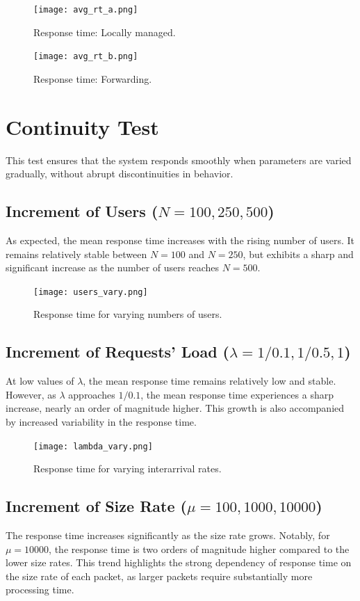 \documentclass{report}
\begin{document}
\begin{figure}[H]
    \centering
    \texttt{[image: avg\_rt\_a.png]}
    \caption{Response time: Locally managed.}
    \label{avg_rt_a}
\end{figure}

\begin{figure}[H]
    \centering
    \texttt{[image: avg\_rt\_b.png]}
    \caption{Response time: Forwarding.}
    \label{avg_rt_b}
\end{figure}

\section{Continuity Test}
This test ensures that the system responds smoothly when parameters are varied gradually, without abrupt discontinuities in behavior.

\subsection{Increment of Users ($N = 100, 250, 500$)}\label{nusers}
As expected, the mean response time increases with the rising number of users. It remains relatively stable between $N = 100$ and $N = 250$, but exhibits a sharp and significant increase as the number of users reaches $N = 500$.

\begin{figure}[H]
    \centering
    \texttt{[image: users\_vary.png]}
    \caption{Response time for varying numbers of users.}
\end{figure}

\subsection{Increment of Requests' Load ($\lambda = 1/0.1, 1/0.5, 1$)}
At low values of $\lambda$, the mean response time remains relatively low and stable. However, as $\lambda$ approaches $1/0.1$, the mean response time experiences a sharp increase, nearly an order of magnitude higher. This growth is also accompanied by increased variability in the response time.

\begin{figure}[H]
    \centering
    \texttt{[image: lambda\_vary.png]}
    \caption{Response time for varying interarrival rates.}
\end{figure}

\subsection{Increment of Size Rate ($\mu = 100, 1000, 10000$)}
The response time increases significantly as the size rate grows. Notably, for $\mu = 10000$, the response time is two orders of magnitude higher compared to the lower size rates. This trend highlights the strong dependency of response time on the size rate of each packet, as larger packets require substantially more processing time.
\end{document}
